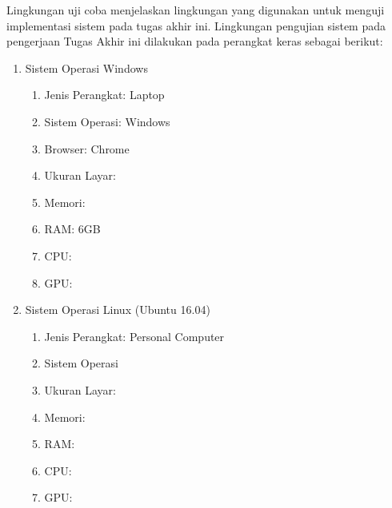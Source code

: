 Lingkungan uji coba menjelaskan lingkungan yang digunakan untuk menguji implementasi sistem pada tugas akhir ini. Lingkungan pengujian sistem pada pengerjaan Tugas Akhir ini dilakukan pada perangkat keras sebagai berikut: 
\begin{enumerate}
	\item Sistem Operasi Windows
		\begin{enumerate}[label=alph*.]
			\item Jenis Perangkat: Laptop
			\item Sistem Operasi: Windows
			\item Browser: Chrome
			\item Ukuran Layar: 
			\item Memori:
			\item RAM: 6GB
			\item CPU: 
			\item GPU:
		\end{enumerate}
	\item Sistem Operasi Linux (Ubuntu 16.04)
		\begin{enumerate}[label=alph*.]
			\item Jenis Perangkat: Personal Computer
			\item Sistem Operasi
			\item Ukuran Layar:
			\item Memori:
			\item RAM:
			\item CPU:
			\item GPU:
		\end{enumerate}
\end{enumerate}
